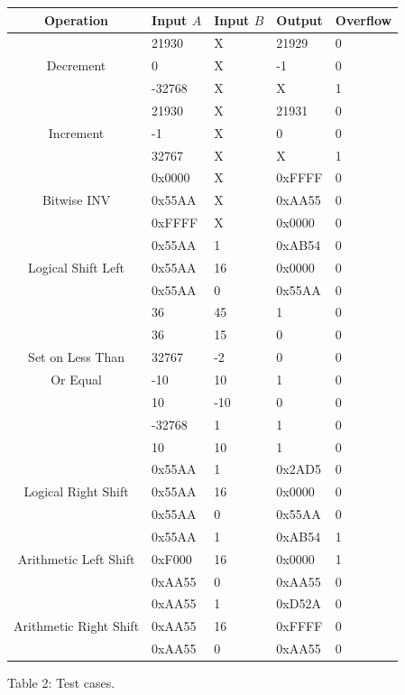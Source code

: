 \documentclass[11pt]{article}
\begin{document}
{\centering
\begin{tabular}{|c|l|l|l|l|}
	\hline
	\textbf{Operation} & \textbf{Input $A$} & \textbf{Input $B$} & \textbf{Output} & \textbf{Overflow} \\
	\hline
	
	\multirow{3}{*}{Decrement} & 21930 & X & 21929 & 0 \\
	& 0 & X & -1 & 0 \\
	& -32768 & X & X & 1 \\
	\hline
	
	\multirow{3}{*}{Increment} & 21930 & X & 21931 & 0 \\
	& -1 & X & 0 & 0 \\
	& 32767 & X & X & 1 \\
	\hline
	
	\multirow{3}{*}{Bitwise INV} & 0x0000 & X & 0xFFFF & 0 \\
	& 0x55AA & X & 0xAA55 & 0 \\
	& 0xFFFF & X & 0x0000 & 0 \\
	\hline
	
	\multirow{3}{*}{Logical Shift Left} & 0x55AA & 1 & 0xAB54 & 0 \\
	& 0x55AA & 16 & 0x0000 & 0 \\
	& 0x55AA & 0 & 0x55AA & 0 \\
	\hline
	
	& 36 & 45 & 1 & 0 \\
	& 36 & 15 & 0 & 0 \\
	Set on Less Than & 32767 & -2 & 0 & 0 \\
	Or Equal & -10 & 10 & 1 & 0 \\
	& 10 & -10 & 0 & 0 \\
	& -32768 & 1 & 1 & 0 \\
	& 10 & 10 & 1 & 0 \\
	\hline
	
	\multirow{3}{*}{Logical Right Shift} & 0x55AA & 1 & 0x2AD5 & 0 \\
	& 0x55AA & 16 & 0x0000 & 0 \\
	& 0x55AA & 0 & 0x55AA & 0 \\
	\hline
	
	\multirow{3}{*}{Arithmetic Left Shift} & 0x55AA & 1 & 0xAB54 & 1 \\
	& 0xF000 & 16 & 0x0000 & 1 \\
	& 0xAA55 & 0 & 0xAA55 & 0 \\
	\hline
	
	\multirow{3}{*}{Arithmetic Right Shift} & 0xAA55 & 1 & 0xD52A & 0 \\
	& 0xAA55 & 16 & 0xFFFF & 0 \\
	& 0xAA55 & 0 & 0xAA55 & 0 \\
	\hline
\end{tabular}

\vspace{12pt}
Table 2: Test cases. \par 
}
\end{document}
